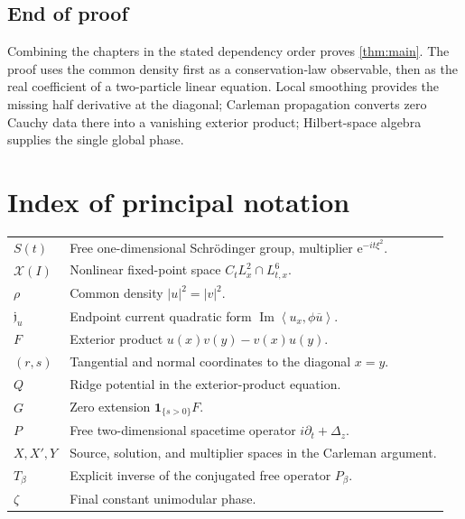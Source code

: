 \documentclass[11pt,oneside]{book}
\theoremstyle{definition}
\theoremstyle{remark}
\newcommand{\1}{\mathbf 1}
\newcommand{\Ima}{\operatorname{Im}}
\newcommand{\pair}[2]{\left\langle #1,#2\right\rangle}
\newcommand{\e}{\mathrm e}
\begin{document}
\section{End of proof}
Combining the chapters in the stated dependency order proves
\cref{thm:main}.  The proof uses the common density first as a conservation-law
observable, then as the real coefficient of a two-particle linear equation.
Local smoothing provides the missing half derivative at the diagonal;
Carleman propagation converts zero Cauchy data there into a vanishing exterior
product; Hilbert-space algebra supplies the single global phase.

\backmatter
\chapter*{Index of principal notation}
\begin{longtable}{p{}p{}}
$S(t)$ & Free one-dimensional Schr\"odinger group, multiplier
$\e^{-it\xi^2}$.\\
$\mathcal X(I)$ & Nonlinear fixed-point space
$C_tL^2_x\cap L^6_{t,x}$.\\
$\rho$ & Common density $|u|^2=|v|^2$.\\
$\mathfrak j_u$ & Endpoint current quadratic form
$\Ima\pair{u_x}{\phi\overline u}$.\\
$F$ & Exterior product $u(x)v(y)-v(x)u(y)$.\\
$(r,s)$ & Tangential and normal coordinates to the diagonal $x=y$.\\
$Q$ & Ridge potential in the exterior-product equation.\\
$G$ & Zero extension $\1_{\{s>0\}}F$.\\
$P$ & Free two-dimensional spacetime operator $i\partial_t+\Delta_z$.\\
$X,X',Y$ & Source, solution, and multiplier spaces in the Carleman argument.\\
$T_\beta$ & Explicit inverse of the conjugated free operator $P_\beta$.\\
$\zeta$ & Final constant unimodular phase.\\
\end{longtable}
\end{document}
